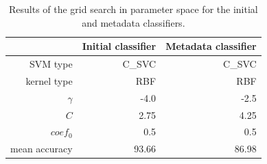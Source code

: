 \begin{table}[h!]
\centering
\begin{tabular}{@{}rrr@{}}
\toprule
& Initial classifier & Metadata classifier \\
\midrule
SVM type & C\_SVC & C\_SVC \\ 
kernel type & RBF & RBF \\
$\gamma$ & -4.0 & -2.5 \\ 
$C$ & 2.75 & 4.25 \\
$coef_0$ & 0.5 & 0.5 \\
\midrule
mean accuracy & 93.66 & 86.98 \\
\bottomrule
\end{tabular}
\caption{Results of the grid search in parameter space for the initial and metadata classifiers.}
\label{tab:classifier_parameters}
\end{table}

